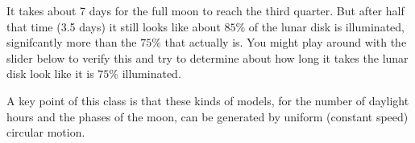 \documentclass{ximera}
\begin{document}

It takes about 7 days for the full moon to reach the third quarter. But after half that time (3.5 days) it still looks like about $85\%$ of the lunar disk is illuminated, signifcantly more than the $75\%$ that actually is. You might play around with the slider below to verify this and try to  determine about how long it takes the lunar disk look like it is $75\%$ illuminated.

 
\begin{onlineOnly}
    \begin{center}
\end{center}
\end{onlineOnly}


A key point of this class is that these kinds of models, for the number of daylight hours and the phases of the moon, can be generated by uniform (constant speed) circular motion.  

\begin{onlineOnly}
    \begin{center}
\end{center}
\end{onlineOnly}
\end{document}
